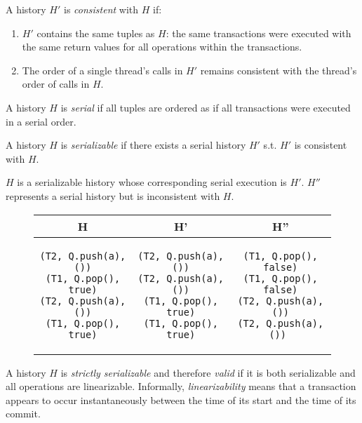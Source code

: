 \begin{defn}
    A history $H'$ is \emph{consistent} with $H$ if:
    \begin{enumerate}
        \item $H'$ contains the same tuples as $H$: the same transactions were executed with the same return values for all operations within the transactions.
        \item The order of a single thread's calls in $H'$ remains consistent with the thread's order of calls in $H$.
    \end{enumerate}
\end{defn}

\begin{defn}
    A history $H$ is \emph{serial} if all tuples are ordered as if all transactions were executed in a serial order.
\end{defn}
\begin{defn}
    A history $H$ is \emph{serializable} if there exists a serial history $H'$ s.t. $H'$ is consistent with $H$.

\end{defn}

\begin{eg}
$H$ is a serializable history whose corresponding serial execution is $H'$. $H''$ represents a serial history but is inconsistent with $H$.
\begin{figure}[H]
\singlespacing   
   \begin{tabular}{c|c|c}
H & H' & H''\\
\hline
\begin{lstlisting}
(T2, Q.push(a), ())
(T1, Q.pop(), true)
(T2, Q.push(a), ())
(T1, Q.pop(), true)
\end{lstlisting} & 
\begin{lstlisting}
(T2, Q.push(a), ())
(T2, Q.push(a), ())
(T1, Q.pop(), true)
(T1, Q.pop(), true)
\end{lstlisting} &
\begin{lstlisting}
(T1, Q.pop(), false)
(T1, Q.pop(), false)
(T2, Q.push(a), ())
(T2, Q.push(a), ()) 
\end{lstlisting}
\end{tabular}
\end{figure}
\end{eg}

\begin{defn}
    A history $H$ is \emph{strictly serializable} and therefore \emph{valid} if it is both serializable and all operations are linearizable. Informally, \emph{linearizability} means that a transaction appears to occur instantaneously between the time of its start and the time of its commit.
\end{defn}

